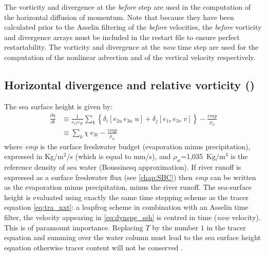 \documentclass[../main/NEMO_manual]{subfiles}
\begin{document}
The vorticity and divergence at the \textit{before} step are used in the computation of
the horizontal diffusion of momentum.
Note that because they have been calculated prior to the Asselin filtering of the \textit{before} velocities,
the \textit{before} vorticity and divergence arrays must be included in the restart file to
ensure perfect restartability.
The vorticity and divergence at the \textit{now} time step are used for the computation of
the nonlinear advection and of the vertical velocity respectively. 

\subsection{Horizontal divergence and relative vorticity (\protect{})}
\label{subsec:DYN_sshwzv}

The sea surface height is given by:
\begin{equation}
  \label{eq:dynspg_ssh}
  \begin{aligned}
    \frac{\partial \eta }{\partial t}
    &\equiv    \frac{1}{e_{1t} e_{2t} }\sum\limits_k { \left\{  \delta_i \left[ {e_{2u}\,e_{3u}\;u} \right]
        +\delta_j \left[ {e_{1v}\,e_{3v}\;v} \right]  \right\} }
    -    \frac{\textit{emp}}{\rho_w }   \\
    &\equiv    \sum\limits_k {\chi \ e_{3t}}  -  \frac{\textit{emp}}{\rho_w }
  \end{aligned}
\end{equation}
where \textit{emp} is the surface freshwater budget (evaporation minus precipitation), 
expressed in Kg/m$^2$/s (which is equal to mm/s),
and $\rho_w$=1,035~Kg/m$^3$ is the reference density of sea water (Boussinesq approximation).
If river runoff is expressed as a surface freshwater flux (see \autoref{chap:SBC}) then
\textit{emp} can be written as the evaporation minus precipitation, minus the river runoff. 
The sea-surface height is evaluated using exactly the same time stepping scheme as
the tracer equation \autoref{eq:tra_nxt}:
a leapfrog scheme in combination with an Asselin time filter,
\ie the velocity appearing in \autoref{eq:dynspg_ssh} is centred in time (\textit{now} velocity).
This is of paramount importance.
Replacing $T$ by the number $1$ in the tracer equation and summing over the water column must lead to
the sea surface height equation otherwise tracer content will not be conserved
\citep{Griffies_al_MWR01, Leclair_Madec_OM09}.
\end{document}

